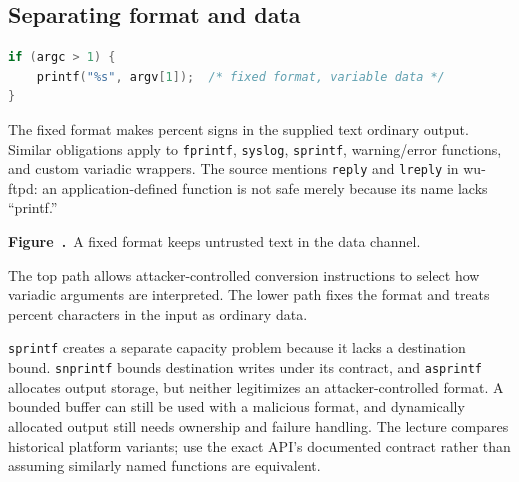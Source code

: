 \documentclass[11pt,a4paper]{article}
\numberwithin{figure}{section}
\newcommand{\diagramcaption}[1]{\par\smallskip\refstepcounter{figure}\begin{center}\small\textbf{Figure~\thefigure.}~#1\end{center}}
\begin{document}
\subsection{Separating format and data}
\begin{lstlisting}[language=C]
if (argc > 1) {
    printf("%s", argv[1]);  /* fixed format, variable data */
}
\end{lstlisting}
The fixed format makes percent signs in the supplied text ordinary output. Similar obligations apply to \texttt{fprintf}, \texttt{syslog}, \texttt{sprintf}, warning/error functions, and custom variadic wrappers. The source mentions \texttt{reply} and \texttt{lreply} in wu-ftpd: an application-defined function is not safe merely because its name lacks ``printf.''

\begin{center}\end{center}
\diagramcaption{A fixed format keeps untrusted text in the data channel.}
The top path allows attacker-controlled conversion instructions to select how variadic arguments are interpreted. The lower path fixes the format and treats percent characters in the input as ordinary data.

\texttt{sprintf} creates a separate capacity problem because it lacks a destination bound. \texttt{snprintf} bounds destination writes under its contract, and \texttt{asprintf} allocates output storage, but neither legitimizes an attacker-controlled format. A bounded buffer can still be used with a malicious format, and dynamically allocated output still needs ownership and failure handling. The lecture compares historical platform variants; use the exact API's documented contract rather than assuming similarly named functions are equivalent.
\end{document}
